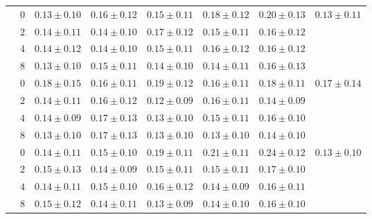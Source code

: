 \begin{table*}[ht]
\begin{tabular}{lc|ccccc|c}
        & $0$ & $0.13 \pm 0.10$ & $0.16 \pm 0.12$ & $0.15 \pm 0.11$ & $0.18 \pm 0.12$ & $0.20 \pm 0.13$ & \multirow{4}{*}{$0.13 \pm 0.11$} \\
        & $2$ & $0.14 \pm 0.11$ & $0.14 \pm 0.10$ & $0.17 \pm 0.12$ & $0.15 \pm 0.11$ & $0.16 \pm 0.12$ & \\
        & $4$ & $0.14 \pm 0.12$ & $0.14 \pm 0.10$ & $0.15 \pm 0.11$ & $0.16 \pm 0.12$ & $0.16 \pm 0.12$ & \\
        & $8$ & $0.13 \pm 0.10$ & $0.15 \pm 0.11$ & $0.14 \pm 0.10$ & $0.14 \pm 0.11$ & $0.16 \pm 0.13$ & \\

        \midrule[.66pt]

        \parbox[t]{2mm}{}

        & $0$ & $0.18 \pm 0.15$ & $0.16 \pm 0.11$ & $0.19 \pm 0.12$ & $0.16 \pm 0.11$ & $0.18 \pm 0.11$ &  \\
        & $2$ & $0.14 \pm 0.11$ & $0.16 \pm 0.12$ & $0.12 \pm 0.09$ & $0.16 \pm 0.11$ & $0.14 \pm 0.09$ & \\
        & $4$ & $0.14 \pm 0.09$ & $0.17 \pm 0.13$ & $0.13 \pm 0.10$ & $0.15 \pm 0.11$ & $0.16 \pm 0.10$ & \\
        & $8$ & $0.13 \pm 0.10$ & $0.17 \pm 0.13$ & $0.13 \pm 0.10$ & $0.13 \pm 0.10$ & $0.14 \pm 0.10$ & \\

        \midrule[.66pt]

        \parbox[t]{2mm}{}

        & $0$ & $0.14 \pm 0.11$ & $0.15 \pm 0.10$ & $0.19 \pm 0.11$ & $0.21 \pm 0.11$ & $0.24 \pm 0.12$ &  \\
        & $2$ & $0.15 \pm 0.13$ & $0.14 \pm 0.09$ & $0.15 \pm 0.11$ & $0.15 \pm 0.11$ & $0.17 \pm 0.10$ & \\
        & $4$ & $0.14 \pm 0.11$ & $0.15 \pm 0.10$ & $0.16 \pm 0.12$ & $0.14 \pm 0.09$ & $0.16 \pm 0.11$ & \\
        & $8$ & $0.15 \pm 0.12$ & $0.14 \pm 0.11$ & $0.13 \pm 0.09$ & $0.14 \pm 0.10$ & $0.16 \pm 0.10$ & \\

    \bottomrule

    \end{tabular}
    \label{tab:size-quality75perc}
\end{table*}


